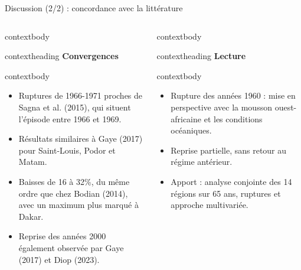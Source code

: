 \documentclass[aspectratio=169,11pt]{beamer}
\begin{document}
\begin{frame}{Discussion (2/2) : concordance avec la littérature}
  \begin{columns}[T,onlytextwidth]
      \begin{beamercolorbox}[wd=\linewidth,rounded=true,sep=0pt]{contextbody}
        \begin{beamercolorbox}[wd=\linewidth,ht=0.38cm,dp=0.08cm,leftskip=0.14cm]{contextheading}
          \bfseries Convergences
        \end{beamercolorbox}
        \begin{beamercolorbox}[wd=\linewidth,sep=0.08cm]{contextbody}
          \footnotesize
          \begin{itemize}
            \setlength\itemsep{0.04cm}
            \item Ruptures de 1966-1971 proches de Sagna et al. (2015), qui situent l’épisode entre \textcolor{marine}{1966 et 1969}.
            \item Résultats similaires à Gaye (2017) pour Saint-Louis, Podor et Matam.
            \item Baisses de 16 à 32\%, du même ordre que chez Bodian (2014), avec un maximum plus marqué à Dakar.
            \item Reprise des années 2000 également observée par Gaye (2017) et Diop (2023).
          \end{itemize}
        \end{beamercolorbox}
      \end{beamercolorbox}
      \begin{beamercolorbox}[wd=\linewidth,rounded=true,sep=0pt]{contextbody}
        \begin{beamercolorbox}[wd=\linewidth,ht=0.38cm,dp=0.08cm,leftskip=0.14cm]{contextheading}
          \bfseries Lecture
        \end{beamercolorbox}
        \begin{beamercolorbox}[wd=\linewidth,sep=0.08cm]{contextbody}
          \footnotesize
          \begin{itemize}
            \setlength\itemsep{0.07cm}
            \item Rupture des années 1960 : mise en perspective avec la mousson ouest-africaine et les conditions océaniques.
            \item Reprise \textcolor{marine}{partielle}, sans retour au régime antérieur.
            \item Apport : analyse conjointe des 14 régions sur 65 ans, ruptures et approche multivariée.

\end{itemize}
\end{beamercolorbox}
\end{beamercolorbox}
\end{columns}
\end{frame}
\end{document}
